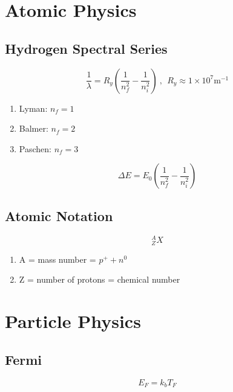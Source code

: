 \documentclass[10pt,letter]{article}
\begin{document}

\section{Atomic Physics}
\subsection{Hydrogen Spectral Series}
\begin{equation}
\frac{1}{\lambda} = R_y \left( \frac{1}{n_f^2} - \frac{1}{n_i^2} \right) ~,~~ R_y\approx 1\times 10^7 \textrm{m}^{-1}
\end{equation}

\begin{enumerate}
    \item Lyman: $n_f = 1$
    \item Balmer: $n_f = 2$
    \item Paschen: $n_f = 3$
\end{enumerate}

\begin{equation}
 \Delta E = E_0 \left( \frac{1}{n_f^2} - \frac{1}{n_i^2} \right)  
\end{equation}

\subsection{Atomic Notation}

\begin{equation}
  ^A_ZX
\end{equation}
\begin{enumerate}
    \item A = mass number = $p^+ + n^0$ 
    \item Z = number of protons = chemical number
\end{enumerate}


\section{Particle Physics}
\subsection{Fermi}
\begin{equation}
 E_F = k_bT_F 
\end{equation}
\end{document}
